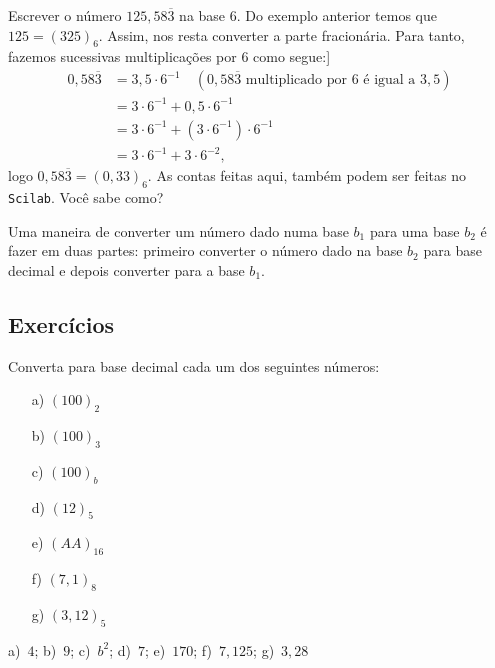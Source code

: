 \begin{ex} Escrever o número $125,58\overline{3}$ na base $6$. Do exemplo anterior temos que $125=(325)_6$. Assim, nos resta converter a parte fracionária. Para tanto, fazemos sucessivas multiplicações por $6$ como segue:]
  \begin{align*}
    0,58\overline{3} &= 3,5\cdot 6^{-1}\quad(\mbox{$0,58\overline{3}$ multiplicado por $6$ é igual a $3,5$})\\
    &= 3\cdot 6^{-1} + 0,5\cdot 6^{-1}\\
    &= 3\cdot 6^{-1} + (3\cdot 6^{-1})\cdot 6^{-1}\\
    &= 3\cdot 6^{-1} + 3\cdot 6^{-2},
  \end{align*}
logo $0,58\overline{3} = (0,33)_6$.
\ifisscilab
As contas feitas aqui, também podem ser feitas no \verb+Scilab+. Você sabe como?
\fi
\end{ex}

Uma maneira de converter um número dado numa base $b_1$ para uma base $b_2$ é fazer em duas partes: primeiro converter o número dado na base $b_2$ para base decimal e depois converter para a base $b_1$.

\subsection{Exercícios}

\indent 
\begin{Exercise} Converta para base decimal cada um dos seguintes números:
  \begin{multicols}{4}
    \begin{itemize}
    \item[a)]  $(100)_2$
    \item[b)]  $(100)_3$
    \item[c)]  $(100)_b$
    \item[d)]  $(12)_5$
    \item[e)]  $(AA)_{16}$
    \item[f)]  $(7,1)_8$
    \item[g)]  $(3,12)_5$
    \end{itemize}    
  \end{multicols}
\end{Exercise}
\begin{Answer}
  \begin{tiny}
    a)~$4$; b)~$9$; c)~$b^2$; d)~$7$; e)~$170$; f)~$7,125$; g)~$3,28$
  \end{tiny}
\end{Answer}

